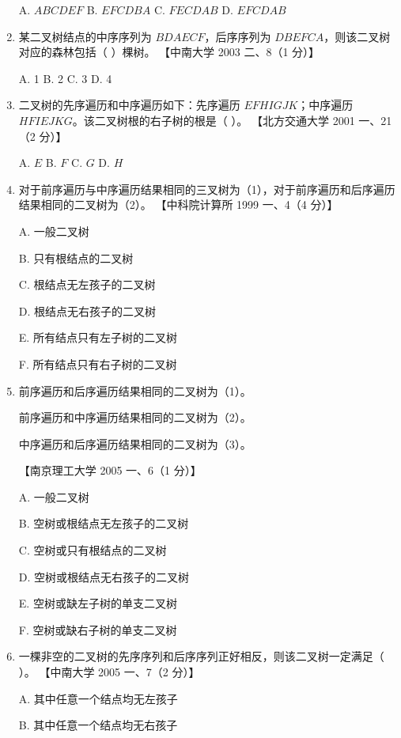 \documentclass[lang=cn,newtx,10pt,scheme=chinese]{../../elegantbook}
\begin{document}
\begin{enumerate}
    A. $ABCDEF$ \quad B. $EFCDBA$ \quad C. $FECDAB$ \quad D. $EFCDAB$  

    \item 某二叉树结点的中序序列为 $BDAECF$，后序序列为 $DBEFCA$，则该二叉树对应的森林包括（ ）棵树。  
    【中南大学 2003 二、8（1 分）】  

    A. 1 \quad B. 2 \quad C. 3 \quad D. 4  

    \item 二叉树的先序遍历和中序遍历如下：先序遍历 $EFHIGJK$；中序遍历 $HFIEJKG$。该二叉树根的右子树的根是（ ）。  
    【北方交通大学 2001 一、21（2 分）】  

    A. $E$ \quad B. $F$ \quad C. $G$ \quad D. $H$  

    \item 对于前序遍历与中序遍历结果相同的三叉树为（1），对于前序遍历和后序遍历结果相同的二叉树为（2）。  
    【中科院计算所 1999 一、4（4 分）】  

    A. 一般二叉树  

    B. 只有根结点的二叉树  

    C. 根结点无左孩子的二叉树  

    D. 根结点无右孩子的二叉树  

    E. 所有结点只有左子树的二叉树 

    F. 所有结点只有右子树的二叉树  

    \item 前序遍历和后序遍历结果相同的二叉树为（1）。  
    
    前序遍历和中序遍历结果相同的二叉树为（2）。

    中序遍历和后序遍历结果相同的二叉树为（3）。 

    【南京理工大学 2005 一、6（1 分）】  

    A. 一般二叉树  

    B. 空树或根结点无左孩子的二叉树  

    C. 空树或只有根结点的二叉树  

    D. 空树或根结点无右孩子的二叉树  

    E. 空树或缺左子树的单支二叉树  

    F. 空树或缺右子树的单支二叉树  

    \item 一棵非空的二叉树的先序序列和后序序列正好相反，则该二叉树一定满足（ ）。  
    【中南大学 2005 一、7（2 分）】  

    A. 其中任意一个结点均无左孩子 

    B. 其中任意一个结点均无右孩子  


\end{enumerate}
\end{document}
